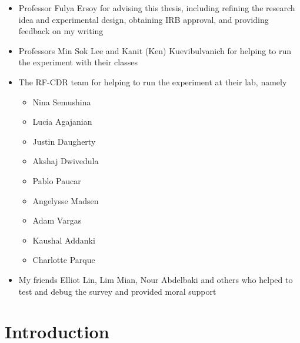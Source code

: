 \documentclass[12pt, letterpaper, DIV=11, numbers=noendperiod]{article}
\providecommand{\tightlist}{\setlength{\itemsep}{0pt}\setlength{\parskip}{0pt}}
\begin{document}
\begin{itemize}
\tightlist
\item
  Professor Fulya Ersoy for advising this thesis, including refining the research idea and experimental design, obtaining IRB approval, and providing feedback on my writing
\item
  Professors Min Sok Lee and Kanit (Ken) Kuevibulvanich for helping to run the experiment with their classes
\item
  The RF-CDR team for helping to run the experiment at their lab, namely

  \begin{itemize}
  \tightlist
  \item
    Nina Semushina
  \item
    Lucia Agajanian
  \item
    Justin Daugherty
  \item
    Akshaj Dwivedula
  \item
    Pablo Paucar
  \item
    Angelysse Madsen
  \item
    Adam Vargas
  \item
    Kaushal Addanki
  \item
    Charlotte Parque
  \end{itemize}
\item
  My friends Elliot Lin, Lim Mian, Nour Abdelbaki and others who helped to test and debug the survey and provided moral support
\end{itemize}

\newpage

\section{Introduction}\label{introduction}
\end{document}
